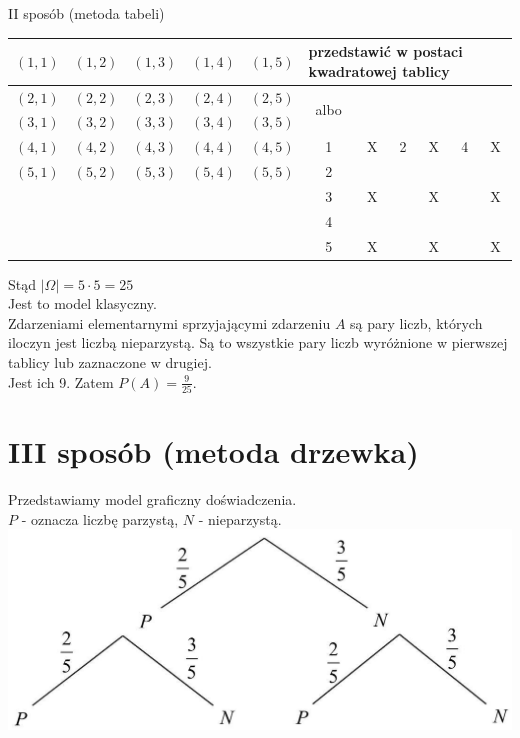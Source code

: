 \documentclass[10pt]{article}
\begin{document}
II sposób (metoda tabeli)

\begin{center}
\begin{tabular}{|c|c|c|c|c|c|c|c|c|c|c|}
\hline
$(1,1)$ & $(1,2)$ & $(1,3)$ & $(1,4)$ & $(1,5)$ & \multicolumn{6}{|l|}{przedstawić w postaci kwadratowej tablicy} \\
\hline
$(2,1)$ & $(2,2)$ & $(2,3)$ & $(2,4)$ & $(2,5)$ & \multirow[b]{2}{*}{albo} &  &  &  &  &  \\
\hline
$(3,1)$ & $(3,2)$ & $(3,3)$ & $(3,4)$ & $(3,5)$ &  &  &  &  &  &  \\
\hline
$(4,1)$ & $(4,2)$ & $(4,3)$ & $(4,4)$ & $(4,5)$ & 1 & X & 2 & X & 4 & X \\
\hline
$(5,1)$ & $(5,2)$ & $(5,3)$ & $(5,4)$ & $(5,5)$ & 2 &  &  &  &  &  \\
\hline
 &  &  &  &  & 3 & X &  & X &  & X \\
\hline
 &  &  &  &  & 4 &  &  &  &  &  \\
\hline
 &  &  &  &  & 5 & X &  & X &  & X \\
\hline
\end{tabular}
\end{center}

Stąd $|\Omega|=5 \cdot 5=25$\\
Jest to model klasyczny.\\
Zdarzeniami elementarnymi sprzyjającymi zdarzeniu $A$ są pary liczb, których iloczyn jest liczbą nieparzystą. Są to wszystkie pary liczb wyróżnione w pierwszej tablicy lub zaznaczone w drugiej.\\
Jest ich 9. Zatem $P(A)=\frac{9}{25}$.

\section*{III sposób (metoda drzewka)}
Przedstawiamy model graficzny doświadczenia.\\
$P$ - oznacza liczbę parzystą, $N$ - nieparzystą.\\
\includegraphics[max width=\textwidth, center]{2025_02_07_cbaae63d39acb23a5920g-19}
\end{document}
